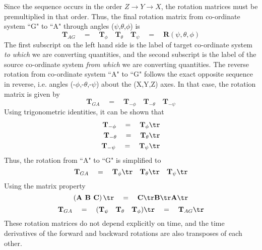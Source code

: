 Since the sequence occurs in the order $Z \rightarrow Y \rightarrow X$, the rotation matrices must be premultiplied in that order. Thus, the final rotation matrix from co-ordinate system ``G" to ``A"  through angles ($\psi$,$\theta$,$\phi$) is
\begin{equation*}
\textbf{T}_{AG} \quad = \quad \textbf{T}_\phi \quad \textbf{T}_\theta \quad \textbf{T}_\psi \quad = \quad \textbf{R}(\psi,\theta,\phi)
\end{equation*}
The first subscript on the left hand side is the label of target co-ordinate system \emph{to which} we are converting quantities, and the second subscript is the label of the source co-ordinate system \emph{from which} we are converting quantities. The reverse rotation from co-ordinate system ``A" to ``G" follows the exact opposite sequence in reverse, i.e. angles (-$\phi$,-$\theta$,-$\psi$) about the (X,Y,Z) axes. In that case, the rotation matrix is given by
\begin{equation*}
\textbf{T}_{GA} \quad = \quad \textbf{T}_{-\phi} \quad \textbf{T}_{-\theta} \quad \textbf{T}_{-\psi}
\end{equation*}
Using trigonometric identities, it can be shown that 
\begin{eqnarray*}
\textbf{T}_{-\phi}    \quad = \quad \textbf{T}_\phi\tr \\
\textbf{T}_{-\theta}  \quad = \quad \textbf{T}_\theta\tr \\
\textbf{T}_{-\psi}    \quad = \quad \textbf{T}_\psi\tr
\end{eqnarray*}
Thus, the rotation from ``A" to ``G" is simplified to
\begin{equation*}
\textbf{T}_{GA} \quad = \quad \textbf{T}_{\phi}\tr \quad \textbf{T}_{\theta}\tr \quad \textbf{T}_{\psi}\tr 
\end{equation*}
Using the matrix property
\begin{equation}
\left( \textbf{A B C} \right)\tr \quad = \quad \textbf{C}\tr \textbf{B}\tr \textbf{A}\tr
\end{equation}
\[\textbf{T}_{GA} \quad = \quad (\textbf{T}_\psi \quad \textbf{T}_\theta \quad \textbf{T}_\phi)\tr  \quad = \quad  \textbf{T}_{AG}\tr\]
These rotation matrices do not depend explicitly on time, and the time derivatives of the forward and backward rotations are also transposes of each other. 

